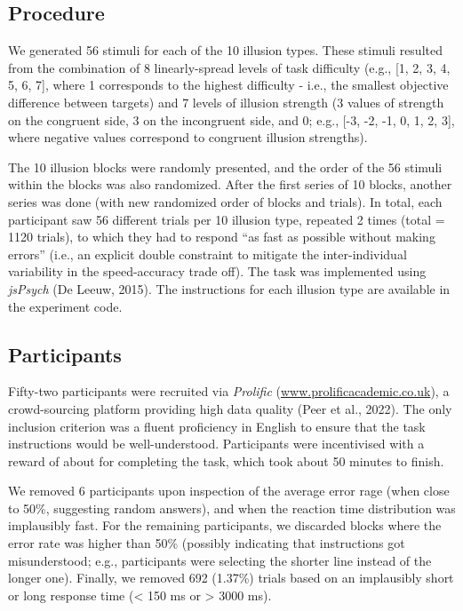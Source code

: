 \documentclass[
  man,floatsintext]{apa6}
\begin{document}
\hypertarget{procedure}{%
\subsection{Procedure}\label{procedure}}

We generated 56 stimuli for each of the 10 illusion types. These stimuli resulted from the combination of 8 linearly-spread levels of task difficulty (e.g., {[}1, 2, 3, 4, 5, 6, 7{]}, where 1 corresponds to the highest difficulty - i.e., the smallest objective difference between targets) and 7 levels of illusion strength (3 values of strength on the congruent side, 3 on the incongruent side, and 0; e.g., {[}-3, -2, -1, 0, 1, 2, 3{]}, where negative values correspond to congruent illusion strengths).

The 10 illusion blocks were randomly presented, and the order of the 56 stimuli within the blocks was also randomized. After the first series of 10 blocks, another series was done (with new randomized order of blocks and trials). In total, each participant saw 56 different trials per 10 illusion type, repeated 2 times (total = 1120 trials), to which they had to respond ``as fast as possible without making errors'' (i.e., an explicit double constraint to mitigate the inter-individual variability in the speed-accuracy trade off). The task was implemented using \emph{jsPsych} (De Leeuw, 2015). The instructions for each illusion type are available in the experiment code.

\hypertarget{participants}{%
\subsection{Participants}\label{participants}}

Fifty-two participants were recruited via \emph{Prolific} (\url{www.prolificacademic.co.uk}), a crowd-sourcing platform providing high data quality (Peer et al., 2022). The only inclusion criterion was a fluent proficiency in English to ensure that the task instructions would be well-understood. Participants were incentivised with a reward of about  for completing the task, which took about 50 minutes to finish.

We removed 6 participants upon inspection of the average error rage (when close to 50\%, suggesting random answers), and when the reaction time distribution was implausibly fast. For the remaining participants, we discarded blocks where the error rate was higher than 50\% (possibly indicating that instructions got misunderstood; e.g., participants were selecting the shorter line instead of the longer one). Finally, we removed 692 (1.37\%) trials based on an implausibly short or long response time (\textless{} 150 ms or \textgreater{} 3000 ms).
\end{document}
